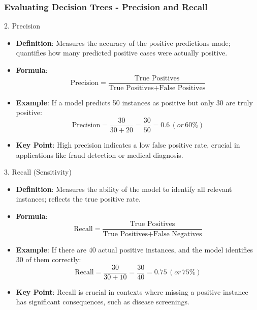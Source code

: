 \documentclass[aspectratio=169]{beamer}
\begin{document}
\begin{frame}[fragile]
    \frametitle{Evaluating Decision Trees - Precision and Recall}
    \begin{block}{2. Precision}
        \begin{itemize}
            \item \textbf{Definition}: Measures the accuracy of the positive predictions made; quantifies how many predicted positive cases were actually positive.
            \item \textbf{Formula}:
            \begin{equation}
            \text{Precision} = \frac{\text{True Positives}}{\text{True Positives} + \text{False Positives}}
            \end{equation}
            \item \textbf{Example}: If a model predicts 50 instances as positive but only 30 are truly positive:
            \begin{equation}
            \text{Precision} = \frac{30}{30 + 20} = \frac{30}{50} = 0.6 \, (or \, 60\%)
            \end{equation}
            \item \textbf{Key Point}: High precision indicates a low false positive rate, crucial in applications like fraud detection or medical diagnosis.
        \end{itemize}
    \end{block}

    \begin{block}{3. Recall (Sensitivity)}
        \begin{itemize}
            \item \textbf{Definition}: Measures the ability of the model to identify all relevant instances; reflects the true positive rate.
            \item \textbf{Formula}:
            \begin{equation}
            \text{Recall} = \frac{\text{True Positives}}{\text{True Positives} + \text{False Negatives}}
            \end{equation}
            \item \textbf{Example}: If there are 40 actual positive instances, and the model identifies 30 of them correctly:
            \begin{equation}
            \text{Recall} = \frac{30}{30 + 10} = \frac{30}{40} = 0.75 \, (or \, 75\%)
            \end{equation}
            \item \textbf{Key Point}: Recall is crucial in contexts where missing a positive instance has significant consequences, such as disease screenings.
        \end{itemize}
    \end{block}
\end{frame}
\end{document}
